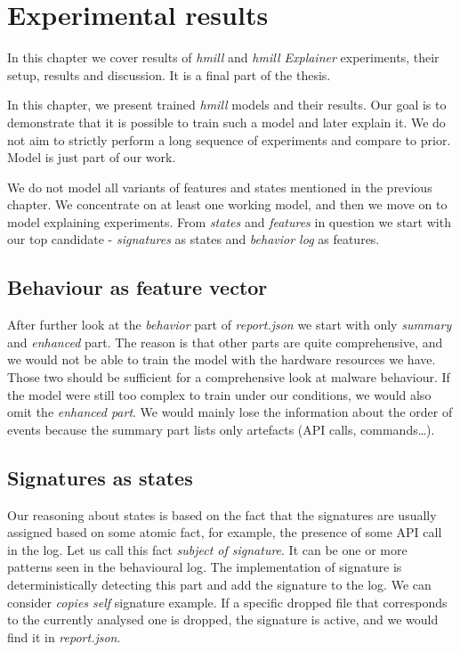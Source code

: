 \chapter{Experimental results} \label{chap:results}
In this chapter we cover results of \emph{hmill} and \emph{hmill Explainer} experiments, their setup, results and discussion. It is a final part of the thesis.




In this chapter, we present trained \emph{hmill} models and their results. Our goal is to demonstrate that it is possible to train such a model and later explain it. We do not aim to strictly perform a long sequence of experiments and compare to prior. Model is just part of our work.

We do not model all variants of features and states mentioned in the previous chapter. We concentrate on at least one working model, and then we move on to model explaining experiments. From \emph{states} and \emph{features} in question we start with our top candidate - \emph{signatures} as states and \emph{behavior log} as features. 

\section{Behaviour as feature vector}
After further look at the \emph{behavior} part of \emph{report.json} we start with only \emph{summary} and \emph{enhanced} part. The reason is that other parts are quite comprehensive, and we would not be able to train the model with the hardware resources we have. Those two should be sufficient for a comprehensive look at malware behaviour. If the model were still too complex to train under our conditions, we would also omit the \emph{enhanced part}. We would mainly lose the information about the order of events because the summary part lists only artefacts (API calls, commands\dots).

\section{Signatures as states}
Our reasoning about states is based on the fact that the signatures are usually assigned based on some atomic fact, for example, the presence of some API call in the log. Let us call this fact \emph{subject of signature}. It can be one or more patterns seen in the behavioural log. The implementation of signature is deterministically detecting this part and add the signature to the log. We can consider \emph{copies self} signature example. If a specific dropped file that corresponds to the currently analysed one is dropped, the signature is active, and we would find it in \emph{report.json}.

